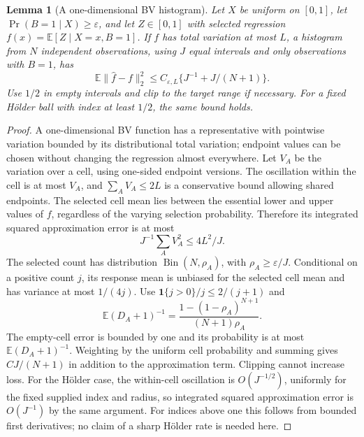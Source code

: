 \documentclass[11pt]{article}
\newtheorem{lemma}[theorem]{Lemma}
\theoremstyle{definition}
\begin{document}
\begin{lemma}[A one-dimensional BV histogram]
Let $X$ be uniform on $[0,1]$, let $\Pr(B=1\mid X)\ge\varepsilon$,
and let $Z\in[0,1]$ with selected regression
$f(x)=\mathbb E[Z\mid X=x,B=1]$. If $f$ has total variation at most $L$,
a histogram from $N$ independent observations, using $J$ equal intervals
and only observations with $B=1$, has
\[
 \mathbb E\|\widehat f-f\|_2^2\le C_{\varepsilon,L}
                     \{J^{-1}+J/(N+1)\}.             \tag{5}
\]
Use $1/2$ in empty intervals and clip to the target range if necessary.
For a fixed H\"older ball with index at least $1/2$, the same bound holds.
\end{lemma}
\begin{proof}
A one-dimensional BV function has a representative with pointwise
variation bounded by its distributional total variation; endpoint values
can be chosen without changing the regression almost everywhere.
Let $V_A$ be the variation over a cell, using one-sided endpoint versions.
The oscillation within the cell is at most $V_A$, and
$\sum_A V_A\le2L$ is a conservative bound allowing shared endpoints.
The selected cell mean lies between the essential lower and upper values
of $f$, regardless of the varying selection probability. Therefore its
integrated squared approximation error is at most
\[
 J^{-1}\sum_A V_A^2\le4L^2/J.
\]
The selected count has distribution $\operatorname{Bin}(N,\rho_A)$,
with $\rho_A\ge\varepsilon/J$. Conditional on a positive count $j$,
its response mean is unbiased for the selected cell mean and has variance
at most $1/(4j)$. Use
$\mathbf1\{j>0\}/j\le2/(j+1)$ and
\[
 \mathbb E(D_A+1)^{-1}
 =\frac{1-(1-\rho_A)^{N+1}}{(N+1)\rho_A}.
\]
The empty-cell error is bounded by one and its probability is at most
$\mathbb E(D_A+1)^{-1}$. Weighting by the uniform cell probability and
summing gives $CJ/(N+1)$ in addition to the approximation term.
Clipping cannot increase loss. For the H\"older case, the within-cell
oscillation is $O(J^{-1/2})$, uniformly for the fixed supplied index and
radius, so integrated squared approximation error is $O(J^{-1})$ by
the same argument. For indices above one this follows from bounded first
derivatives; no claim of a sharp H\"older rate is needed here.
\end{proof}
\end{document}
